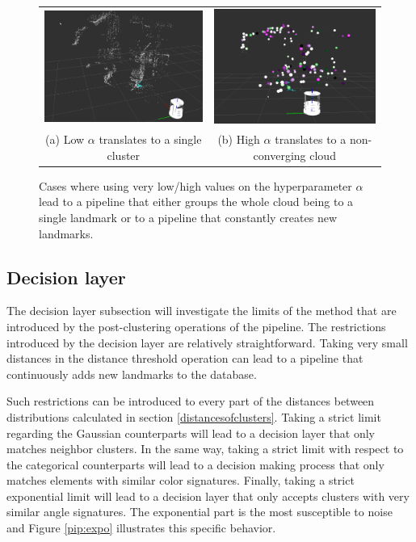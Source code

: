 \documentclass [twoside,hidelinks]{article}
\begin{document}
\begin{figure}
\begin{tabular}{cc}
    \includegraphics [width=.5\textwidth]{singlecluster} &  \includegraphics [width=.5\textwidth]{onlyclusters2} \\
   (a) Low $\alpha$ translates to a single cluster  &  (b) High $\alpha$ translates to a non-converging cloud \\ [6pt]
\end{tabular}
\caption{Cases where using very low/high values on the hyperparameter $\alpha$ lead to a pipeline that either groups the whole cloud being to a single landmark or to a pipeline that constantly creates new landmarks.}
  \label{pip:limits}
\end{figure}

\subsection{Decision layer}


The decision layer subsection will investigate the limits of the method that are introduced by the post-clustering operations of the pipeline.
The restrictions introduced by the decision layer are relatively straightforward. Taking very small distances in the distance threshold operation can lead to a pipeline that continuously adds new landmarks to the database. 

Such restrictions can be introduced to every part of the distances between distributions calculated in section \ref{distancesofclusters}. Taking a strict limit regarding the Gaussian counterparts will lead to a decision layer that only matches neighbor clusters. In the same way, taking a strict limit with respect to the categorical counterparts will lead to a decision making process that only matches elements with similar color signatures. Finally, taking a strict exponential limit will lead to a decision layer that only accepts clusters with very similar angle signatures.
The exponential part is the most susceptible to noise and Figure \ref{pip:expo} illustrates this specific behavior.
\end{document}
